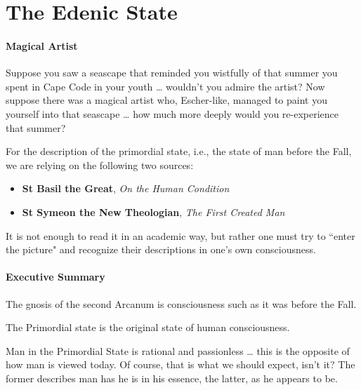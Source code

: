 \section{The Edenic State}

\paragraph{Magical Artist}

Suppose you saw a seascape that reminded you wistfully of that summer you spent in Cape Code in your youth … wouldn't you admire the artist? Now suppose there was a magical artist who, Escher-like, managed to paint you yourself into that seascape … how much more deeply would you re-experience that summer?

For the description of the primordial state, i.e., the state of man before the Fall, we are relying on the following two sources:

\begin{itemize}
\item \textbf{St Basil the Great}, \emph{On the Human Condition} 
\item \textbf{St Symeon the New Theologian}, \emph{The First Created Man} 
\end{itemize}
It is not enough to read it in an academic way, but rather one must try to ``enter the picture" and recognize their descriptions in one's own consciousness.

\paragraph{Executive Summary}
\begin{quotex}
The gnosis of the second Arcanum is consciousness such as it was before the Fall. 

\end{quotex}
The Primordial state is the original state of human consciousness.

Man in the Primordial State is rational and passionless … this is the opposite of how man is viewed today. Of course, that is what we should expect, isn't it? The former describes man has he is in his essence, the latter, as he appears to be.

